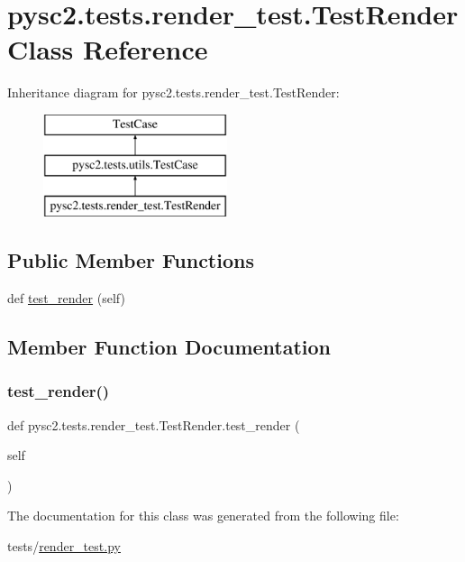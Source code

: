 \hypertarget{classpysc2_1_1tests_1_1render__test_1_1_test_render}{}\section{pysc2.\+tests.\+render\+\_\+test.\+Test\+Render Class Reference}
\label{classpysc2_1_1tests_1_1render__test_1_1_test_render}
Inheritance diagram for pysc2.\+tests.\+render\+\_\+test.\+Test\+Render\+:\begin{figure}[H]
\begin{center}
\leavevmode
\includegraphics[height=3.000000cm]{classpysc2_1_1tests_1_1render__test_1_1_test_render}
\end{center}
\end{figure}
\subsection*{Public Member Functions}
\begin{DoxyCompactItemize}
\item 
def \mbox{\hyperlink{classpysc2_1_1tests_1_1render__test_1_1_test_render_a9f7f747372422dc5ef289af15886e4a8}{test\+\_\+render}} (self)
\end{DoxyCompactItemize}


\subsection{Member Function Documentation}
\mbox{\label{classpysc2_1_1tests_1_1render__test_1_1_test_render_a9f7f747372422dc5ef289af15886e4a8}} 
\subsubsection{\texorpdfstring{test\+\_\+render()}{test\_render()}}
{\footnotesize\ttfamily def pysc2.\+tests.\+render\+\_\+test.\+Test\+Render.\+test\+\_\+render (\begin{DoxyParamCaption}\item[{}]{self }\end{DoxyParamCaption})}



The documentation for this class was generated from the following file\+:\begin{DoxyCompactItemize}
\item 
tests/\mbox{\hyperlink{render__test_8py}{render\+\_\+test.\+py}}\end{DoxyCompactItemize}
